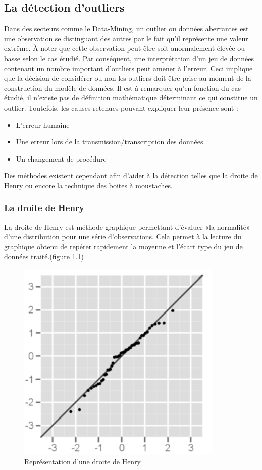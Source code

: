 \documentclass[memoire.tex]{subfiles}
\begin{document}
\subsection{La détection d'outliers}
Dans des secteurs comme le Data-Mining, un outlier ou données aberrantes est une observation se distinguant des autres par le fait qu'il représente une valeur extrême. À noter que cette observation peut être soit anormalement élevée ou basse selon le cas étudié. Par conséquent, une interprétation d'un jeu de données contenant un nombre important d'outliers peut amener à l'erreur. Ceci implique que la décision de considérer ou non les outliers doit être prise au moment de la construction du modèle de données. Il est à remarquer qu'en fonction du cas étudié, il n'existe pas de définition mathématique déterminant ce qui constitue un outlier. Toutefois, les causes retenues pouvant expliquer leur présence sont : \begin{itemize}
\item L'erreur humaine
\item Une erreur lors de la transmission/transcription des données
\item Un changement de procédure
\end{itemize}
Des méthodes existent cependant afin d'aider à la détection telles que la  droite de Henry ou encore la technique des boites à moustaches.
\subsubsection{La droite de Henry}
La droite de Henry est méthode graphique permettant d'évaluer «la normalité» d'une distribution pour une série d'observations. Cela permet à la lecture du graphique obtenu de repérer rapidement la moyenne et l'écart type du jeu de données traité.(figure 1.1)
	\begin{figure}[h!]
		\centerline{\includegraphics[scale=0.8]{img/henry.png}}
		\caption{Représentation d'une droite de Henry}
	\end{figure}
\end{document}
